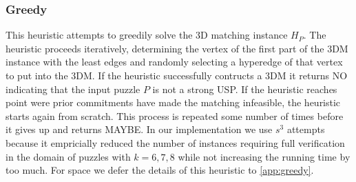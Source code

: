 \documentclass[11pt]{article}
\begin{document}


\subsubsection{Greedy}

This heuristic attempts to greedily solve the 3D matching instance
$H_P$.  The heuristic proceeds iteratively, determining the vertex of
the first part of the 3DM instance with the least edges and randomly
selecting a hyperedge of that vertex to put into the 3DM.  If the
heuristic successfully contructs a 3DM it returns NO indicating that
the input puzzle $P$ is not a strong USP.  If the heuristic reaches
point were prior commitments have made the matching infeasible, the
heuristic starts again from scratch.  This process is repeated some
number of times before it gives up and returns MAYBE.  In our
implementation we use $s^3$ attempts because it empricially reduced
the number of instances requiring full verification in the domain of
puzzles with $k = 6, 7, 8$ while not increasing the running time by
too much.  For space we defer the details of this heuristic to
\autoref{app:greedy}.





\end{document}
